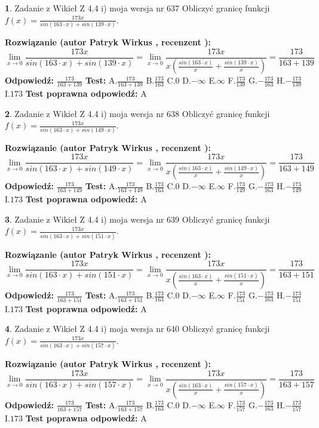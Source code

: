 \documentclass[12pt, a4paper]{article}
\theoremstyle{definition} %
\newtheorem{zad}{}
\newcommand{\zadStart}[1]{\begin{zad}#1\newline}
\newcommand{\zadStop}{\end{zad}}
\newcommand{\rozwStart}[2]{\noindent \textbf{Rozwiązanie (autor #1 , recenzent #2): }\newline}
\newcommand{\rozwStop}{\newline}
\newcommand{\odpStart}{\noindent \textbf{Odpowiedź:}\newline}
\newcommand{\odpStop}{\newline}
\newcommand{\testStart}{\noindent \textbf{Test:}\newline}
\newcommand{\testStop}{\newline}
\newcommand{\kluczStart}{\noindent \textbf{Test poprawna odpowiedź:}\newline}
\newcommand{\kluczStop}{\newline}
\begin{document}
\zadStart{Zadanie z Wikieł Z 4.4 i) moja wersja nr 637}
Obliczyć granicę funkcji $f(x)=\frac{173x}{sin(163\cdot x) +sin(139\cdot x)}$.
\zadStop
\rozwStart{Patryk Wirkus}{}
$$\lim\limits_{x\to 0}\frac{173x}{sin(163\cdot x) +sin(139\cdot x)}=\lim\limits_{x\to 0}\frac{173x}{x(\frac{sin(163\cdot x)}{x}+\frac{sin(139\cdot x)}{x})}=\frac{173}{163+139}$$
\rozwStop
\odpStart
$\frac{173}{163+139}$
\odpStop
\testStart
A.$\frac{173}{163+139}$
B.$\frac{173}{163}$
C.$0$
D.$-\infty$
E.$\infty$
F.$\frac{173}{139}$
G.$-\frac{173}{163}$
H.$-\frac{173}{139}$
I.$173$
\testStop
\kluczStart
A
\kluczStop



\zadStart{Zadanie z Wikieł Z 4.4 i) moja wersja nr 638}
Obliczyć granicę funkcji $f(x)=\frac{173x}{sin(163\cdot x) +sin(149\cdot x)}$.
\zadStop
\rozwStart{Patryk Wirkus}{}
$$\lim\limits_{x\to 0}\frac{173x}{sin(163\cdot x) +sin(149\cdot x)}=\lim\limits_{x\to 0}\frac{173x}{x(\frac{sin(163\cdot x)}{x}+\frac{sin(149\cdot x)}{x})}=\frac{173}{163+149}$$
\rozwStop
\odpStart
$\frac{173}{163+149}$
\odpStop
\testStart
A.$\frac{173}{163+149}$
B.$\frac{173}{163}$
C.$0$
D.$-\infty$
E.$\infty$
F.$\frac{173}{149}$
G.$-\frac{173}{163}$
H.$-\frac{173}{149}$
I.$173$
\testStop
\kluczStart
A
\kluczStop



\zadStart{Zadanie z Wikieł Z 4.4 i) moja wersja nr 639}
Obliczyć granicę funkcji $f(x)=\frac{173x}{sin(163\cdot x) +sin(151\cdot x)}$.
\zadStop
\rozwStart{Patryk Wirkus}{}
$$\lim\limits_{x\to 0}\frac{173x}{sin(163\cdot x) +sin(151\cdot x)}=\lim\limits_{x\to 0}\frac{173x}{x(\frac{sin(163\cdot x)}{x}+\frac{sin(151\cdot x)}{x})}=\frac{173}{163+151}$$
\rozwStop
\odpStart
$\frac{173}{163+151}$
\odpStop
\testStart
A.$\frac{173}{163+151}$
B.$\frac{173}{163}$
C.$0$
D.$-\infty$
E.$\infty$
F.$\frac{173}{151}$
G.$-\frac{173}{163}$
H.$-\frac{173}{151}$
I.$173$
\testStop
\kluczStart
A
\kluczStop



\zadStart{Zadanie z Wikieł Z 4.4 i) moja wersja nr 640}
Obliczyć granicę funkcji $f(x)=\frac{173x}{sin(163\cdot x) +sin(157\cdot x)}$.
\zadStop
\rozwStart{Patryk Wirkus}{}
$$\lim\limits_{x\to 0}\frac{173x}{sin(163\cdot x) +sin(157\cdot x)}=\lim\limits_{x\to 0}\frac{173x}{x(\frac{sin(163\cdot x)}{x}+\frac{sin(157\cdot x)}{x})}=\frac{173}{163+157}$$
\rozwStop
\odpStart
$\frac{173}{163+157}$
\odpStop
\testStart
A.$\frac{173}{163+157}$
B.$\frac{173}{163}$
C.$0$
D.$-\infty$
E.$\infty$
F.$\frac{173}{157}$
G.$-\frac{173}{163}$
H.$-\frac{173}{157}$
I.$173$
\testStop
\kluczStart
A
\kluczStop
\end{document}
